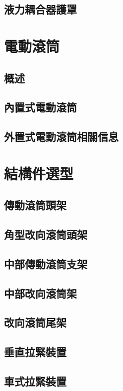 \documentclass[UTF8]{ctexart}
\begin{document}
\subsection{液力耦合器護罩}




\newpage
\section{電動滾筒}
\subsection{概述}
\subsection{內置式電動滾筒}
\subsection{外置式電動滾筒相關信息}





\newpage
\section{結構件選型}
\subsection{傳動滾筒頭架}
\subsection{角型改向滾筒頭架}
\subsection{中部傳動滾筒支架}
\subsection{中部改向滾筒架}
\subsection{改向滾筒尾架}
\subsection{垂直拉緊裝置}
\subsection{車式拉緊裝置}
\end{document}
